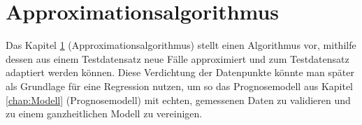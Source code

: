 


\chapter{Approximationsalgorithmus}
\label{chap:Approximationsalgorithmus}

Das Kapitel \ref{chap:Approximationsalgorithmus} (Approximationsalgorithmus) stellt einen Algorithmus vor, mithilfe dessen aus einem Testdatensatz neue Fälle approximiert und zum Testdatensatz adaptiert werden können. Diese Verdichtung der Datenpunkte könnte man später als Grundlage für eine Regression nutzen, um so das Prognosemodell aus Kapitel \ref{chap:Modell} (Prognosemodell) mit echten, gemessenen Daten zu validieren und zu einem ganzheitlichen Modell zu vereinigen.




